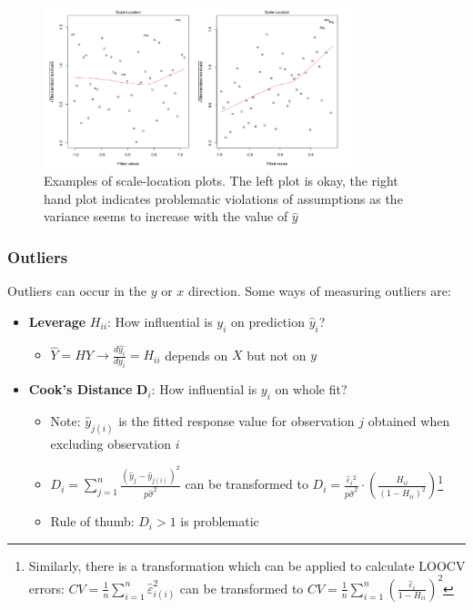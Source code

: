 \documentclass[11pt, %
	oneside, %
	english, %
	onehalfspacing, %
	]{article} %
\numberwithin{equation}{section}
\begin{document}
\begin{figure}
    \caption{Examples of scale-location plots. The left plot is okay, the right hand plot indicates problematic violations of assumptions as the variance seems to increase with the value of $\hat{y}$}
    \label{fig:scale_loc}
    \begin{center}
        \includegraphics[width = 0.8\textwidth]{scale_location.png}
    \end{center}
\end{figure}

\subsubsection*{Outliers}

Outliers can occur in the $y$ or $x$ direction. Some ways of measuring outliers are:

\begin{itemize}
	\item \textbf{Leverage} $H_{i i}$: How influential is $y_i$ on prediction $\widehat{y}_i$?
	\begin{itemize}
		\item $\widehat{Y}=H Y \rightarrow \frac{d \widehat{y_i}}{d y_i}=H_{i i}$ depends on $X$ but not on $y$
	\end{itemize}
	\item \textbf{Cook's Distance} $\mathbf{D}_i$: How influential is $y_i$ on whole fit?
	\begin{itemize}
		\item Note: $\hat{y}_{j(i)}$ is the fitted response value for observation $j$ obtained when excluding observation $i$
		\item $D_i=\sum_{j=1}^n \frac{\left(\hat{y}_j-\hat{y}_{j(i)}\right)^2}{p \hat{\sigma}^2}$ can be transformed to $D_i=\frac{\hat{\varepsilon}_i{ }^2}{p \widehat{\sigma}^2} \cdot\left(\frac{H_{i i}}{\left(1-H_{i i}\right)^2}\right)$\footnote{Similarly, there is a transformation which can be applied to calculate LOOCV errors: $C V=\frac{1}{n} \sum_{i=1}^n \hat{\varepsilon}_{i(i)}^2$ can be transformed to $C V=\frac{1}{n} \sum_{i=1}^n\left(\frac{\hat{\varepsilon}_i}{1-H_{i i}}\right)^2$}
		\item Rule of thumb: $D_i>1$ is problematic
	\end{itemize}
\end{itemize}
\end{document}
